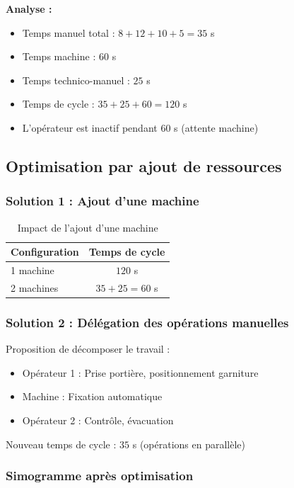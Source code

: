\documentclass[a4paper,12pt]{article}
\begin{document}
\textbf{Analyse :}
\begin{itemize}
    \item Temps manuel total : $8+12+10+5 = 35$ s
    \item Temps machine : $60$ s
    \item Temps technico-manuel : $25$ s
    \item Temps de cycle : $35+25+60 = 120$ s
    \item L'opérateur est inactif pendant $60$ s (attente machine)
\end{itemize}

\subsection{Optimisation par ajout de ressources}

\subsubsection{Solution 1 : Ajout d'une machine}

\begin{table}[ht]
\centering
\begin{tabular}{|l|c|}
\hline
\textbf{Configuration} & \textbf{Temps de cycle} \\
\hline
1 machine & $120$ s \\
2 machines & $35+25 = 60$ s \\
\hline
\end{tabular}
\caption{Impact de l'ajout d'une machine}
\end{table}

\subsubsection{Solution 2 : Délégation des opérations manuelles}

Proposition de décomposer le travail :
\begin{itemize}
    \item Opérateur 1 : Prise portière, positionnement garniture
    \item Machine : Fixation automatique
    \item Opérateur 2 : Contrôle, évacuation
\end{itemize}

Nouveau temps de cycle : $35$ s (opérations en parallèle)

\subsubsection{Simogramme après optimisation}
\end{document}
